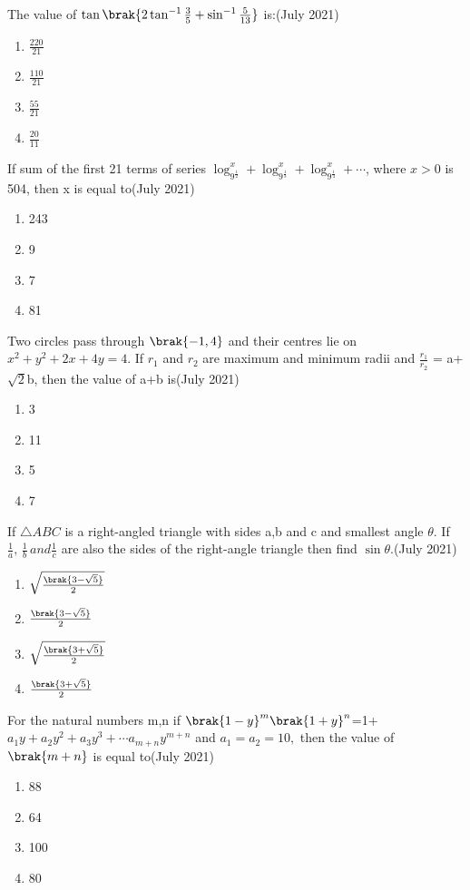 \iffalse
\title{Assignment}
\author{EE24BTECH11038}
\section{mcq-single}
\fi
\item  The value of $\tan \brak{{2\tan^{-1}{\frac{3}{5}+\sin^{-1}{\frac{5}{13}}}}}$ is:\hfill(July 2021)
\begin{enumerate}
    \item $\frac{220}{21}$\\
    \item $\frac{110}{21}$\\
    \item $\frac{55}{21}$\\
    \item $\frac{20}{11}$
\end{enumerate}
\item  If sum of the first 21 terms of series $\log_{9^\frac{1}{2}}^{x}+\log_{9^\frac{1}{3}}^{x}+\log_{9^\frac{1}{4}}^{x}+ \cdots $, where $x>0$ is 504, then x is equal to\hfill(July 2021)
\begin{enumerate}
    \item 243
    \item 9
    \item 7
    \item 81
\end{enumerate}
\item Two circles pass through $\brak{-1,4}$ and their centres lie on $x^2+y^2+2x+4y = 4$. If $r_1$ and $r_2$ are maximum and minimum radii and $\frac{r_1}{r_2}$ = a+$\sqrt{2}$b, then the value of a+b is\hfill(July 2021)
\begin{enumerate}
    \item 3
    \item 11
    \item 5
    \item 7
\end{enumerate}
\item If $\triangle ABC$ is a right-angled triangle with sides a,b and c and smallest angle $\theta$. If $\frac{1}{a} , \,\frac{1}{b}\, and \frac{1}{c}$ are also the sides of the right-angle triangle then find $\sin{\theta}$.\hfill(July 2021)
\begin{enumerate}
    \item $\sqrt{\frac{\brak{3-\sqrt{5}}}{2}}$\\
    \item $\frac{\brak{3-\sqrt{5}}}{2}$\\
    \item $\sqrt{\frac{\brak{3+\sqrt{5}}}{2}}$\\
    \item ${\frac{\brak{3+\sqrt{5}}}{2}}$
\end{enumerate}
\item For the natural numbers m,n if $\brak{1-y}^m\brak{1+y}^n$=1+$a_1y+a_2y^2+a_3y^3+\cdots a_{m+n}y^{m+n}$ and $a_1=a_2=10,$ then the value of $\brak{m+n}$ is equal to\hfill(July 2021)
\begin{enumerate}
    \item 88
    \item 64
    \item 100
    \item 80
\end{enumerate}

